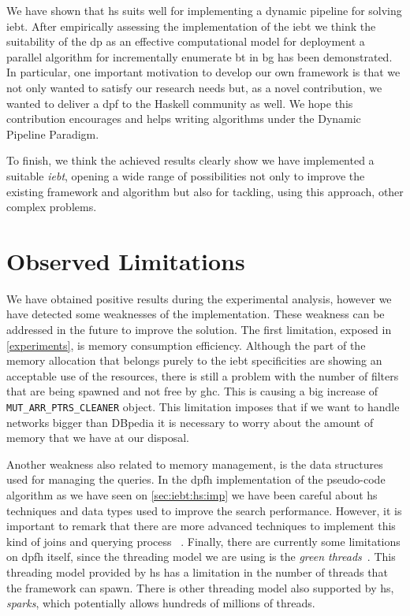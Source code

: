 We have shown that \acrlong{hs} suits well for implementing a dynamic pipeline for solving \acrlong{iebt}. After empirically assessing the implementation of the \acrshort{iebt} we think the suitability of the  \acrlong{dp} as an effective  computational model for deployment a parallel algorithm  for incrementally enumerate \acrlong{bt} in \acrlong{bg} has been  demonstrated. 
In particular, one important motivation to develop our own framework is that we not only wanted to satisfy our research needs but, as a novel contribution, we wanted to deliver a \acrshort{dpf} to the Haskell community as well. We hope this contribution encourages and helps writing algorithms under the Dynamic Pipeline Paradigm.

To finish, we think the achieved results clearly show we have implemented a suitable \emph{\acrlong{iebt}}, opening a wide range of possibilities not only to improve the existing framework and algorithm but also for tackling, using this approach, other complex problems.

\section{Observed Limitations}
We have  obtained positive results during the experimental analysis, however we have detected some weaknesses of the implementation.  These weakness can be addressed in the future to improve  the solution. 
The first  limitation, exposed in  \autoref{experiments}, is memory consumption  efficiency. Although the part of the memory allocation that belongs purely to the \acrshort{iebt} specificities are showing an acceptable use of the resources, there is still a problem with the number of filters that are being spawned and not free by \acrshort{ghc}.
This is causing a big increase of \texttt{MUT\_ARR\_PTRS\_CLEANER} object. This  limitation  imposes that if we want to handle networks bigger than DBpedia it is necessary to worry about the amount of memory that we have at our disposal. 

Another weakness also related to memory management, is the data structures used for managing the queries. In the \acrshort{dpfh} implementation of the pseudo-code algorithm as we have seen on \autoref{sec:iebt:hs:imp} we have been careful about \acrshort{hs} techniques and data types used to improve the search performance. However, it is important to remark that there are more advanced techniques to implement this kind of joins and querying process ~\cite{Lai}.
Finally, there are currently some limitations on \acrlong{dpfh} itself, since the threading model we are using is the \textit{green threads}~\cite{sparks}. This  threading model provided by  \acrshort{hs} has a limitation in the number of threads that the framework can spawn. There is other threading model also supported by \acrshort{hs}, \textit{sparks},  which potentially allows hundreds of millions of threads.

